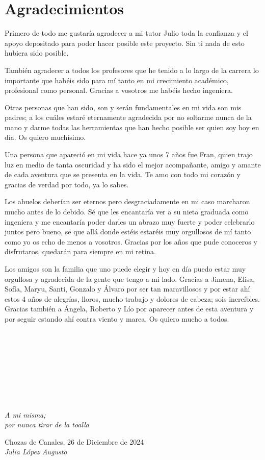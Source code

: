 \cleardoublepage

\chapter*{Agradecimientos}

Primero de todo me gustaría agradecer a mi tutor Julio toda la confianza y el apoyo depositado para poder hacer posible este proyecto. Sin ti nada de esto hubiera sido posible.

También agradecer a todos los profesores que he tenido a lo largo de la carrera lo importante que habéis sido para mí tanto en mi crecimiento académico, profesional como personal. Gracias a vosotros me habéis hecho ingeniera.

Otras personas que han sido, son y serán fundamentales en mi vida son mis padres; a los cuáles estaré eternamente agradecida por no soltarme nunca de la mano y darme todas las herramientas que han hecho posible ser quien soy hoy en día. Os quiero muchísimo.

Una persona que apareció en mi vida hace ya unos 7 años fue Fran, quien trajo luz en medio de tanta oscuridad y ha sido el mejor acompañante, amigo y amante de cada aventura que se presenta en la vida. Te amo con todo mi corazón y gracias de verdad por todo, ya lo sabes.

Los abuelos deberían ser eternos pero desgraciadamente en mi caso marcharon mucho antes de lo debido. Sé que les encantaría ver a su nieta graduada como ingeniera y me encantaría poder darles un abrazo muy fuerte y poder celebrarlo juntos pero bueno, se que allá donde estéis estaréis muy orgullosos de mí tanto como yo os echo de menos a vosotros. Gracias por los años que pude conoceros y disfrutaros, quedarán para siempre en mi retina. 

Los amigos son la familia que uno puede elegir y hoy en día puedo estar muy orgullosa y agradecida de la gente que tengo a mi lado. Gracias a Jimena, Elisa, Sofía, Maryu, Santi, Gonzalo y Álvaro por ser tan maravillosos y por estar ahí estos 4 años de alegrías, lloros, mucho trabajo y dolores de cabeza; sois increíbles. Gracias también a Ángela, Roberto y Lío por aparecer antes de esta aventura y por seguir estando ahí contra viento y marea. Os quiero mucho a todos. \\
\ %

\

\

\

\

\begin{flushright}
		\vspace{4.0 cm}
		\emph{A mi misma;\\
      por nunca tirar de la toalla}\\
		\par
		\vspace{1.0 cm}
		Chozas de Canales, 26 de Diciembre de 2024\\ %
		\emph{Julia López Augusto}
\end{flushright}

\thispagestyle{empty}

